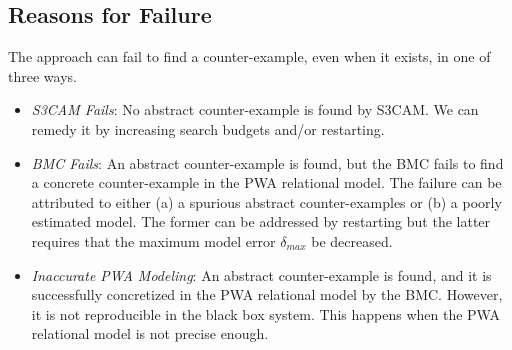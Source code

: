 \subsection{Reasons for Failure}
The approach can fail to find a counter-example, even when it exists, in
one of three ways.

\begin{itemize}

    \item \emph{S3CAM Fails}: No abstract counter-example is found by
        S3CAM. We can remedy it by increasing search budgets and/or
        restarting.

    \item \emph{BMC Fails}: An abstract counter-example is found, but
        the BMC fails to find a concrete counter-example in the PWA
        relational model. The failure can be attributed to either (a)
        a spurious abstract counter-examples or (b) a poorly estimated
        model. The former can be addressed by restarting but the
        latter requires that the maximum model error $\delta_{max}$ be
        decreased.

    \item \emph{Inaccurate PWA Modeling}: An abstract counter-example
        is found, and it is successfully concretized in the PWA
        relational model by the BMC. However, it is not reproducible
        in the black box system. This happens when the PWA relational
        model is not precise enough.
\end{itemize}
